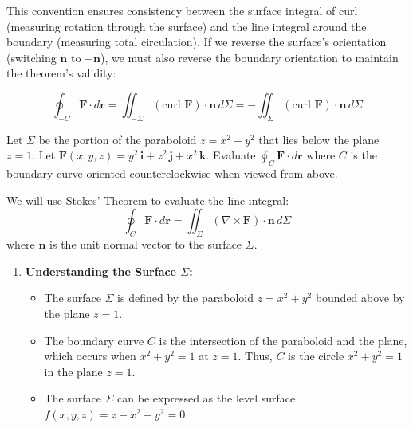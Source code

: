 \noindent This convention ensures consistency between the surface integral of curl (measuring rotation through the surface) and the line integral around the boundary (measuring total circulation). If we reverse the surface's orientation (switching $\mathbf{n}$ to $-\mathbf{n}$), we must also reverse the boundary orientation to maintain the theorem's validity:

\[
\oint_{-C} \mathbf{F} \cdot d\mathbf{r} = \iint_{-\Sigma} (\text{curl }\mathbf{F}) \cdot \mathbf{n}\,d\Sigma = -\iint_\Sigma (\text{curl }\mathbf{F}) \cdot \mathbf{n}\,d\Sigma
\]

\exampleline
\begin{example}
Let $\Sigma$ be the portion of the paraboloid $z = x^2 + y^2$ that lies below the plane $z = 1$. Let $\mathbf{F}(x,y,z) = y^2\,\mathbf{i} + z^2\,\mathbf{j} + x^2\,\mathbf{k}$. Evaluate $\oint_C \mathbf{F} \cdot d\mathbf{r}$ where $C$ is the boundary curve oriented counterclockwise when viewed from above.

\begin{solution}
We will use Stokes' Theorem to evaluate the line integral:
\[
\oint_C \mathbf{F} \cdot d\mathbf{r} = \iint_\Sigma (\nabla \times \mathbf{F}) \cdot \mathbf{n}\,d\Sigma
\]
where $\mathbf{n}$ is the unit normal vector to the surface $\Sigma$.

\begin{enumerate}
    \item \textbf{Understanding the Surface $\Sigma$:}
    \begin{itemize}
        \item The surface $\Sigma$ is defined by the paraboloid $z = x^2 + y^2$ bounded above by the plane $z = 1$.
        \item The boundary curve $C$ is the intersection of the paraboloid and the plane, which occurs when $x^2 + y^2 = 1$ at $z = 1$. Thus, $C$ is the circle $x^2 + y^2 = 1$ in the plane $z = 1$.
        \item The surface $\Sigma$ can be expressed as the level surface $f(x,y,z) = z - x^2 - y^2 = 0$.
    \end{itemize}
    

\end{enumerate}
\end{solution}
\end{example}
